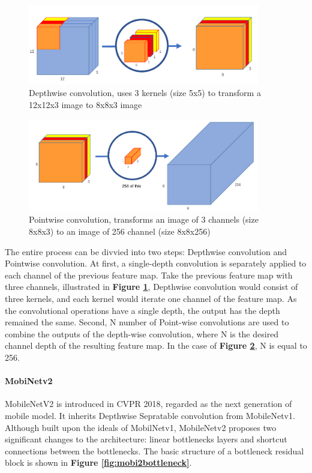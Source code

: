  \begin{figure}[H]
     \centering
     \includegraphics[width=0.9\textwidth]{chapter2/image/mobi1.png}
     \caption{Depthwise convolution, uses 3 kernels (size 5x5) to transform a 12x12x3 image to 8x8x3 image}
     \label{fig:mobi1}
 \end{figure}
 
 \begin{figure}[H]
     \centering
     \includegraphics[width=0.9\textwidth]{chapter2/image/mobi2.png}
     \caption{Pointwise convolution, transforms an image of 3 channels (size 8x8x3) to an image of 256 channel (size 8x8x256)}
     \label{fig:mobi2}
 \end{figure}
 
 The entire process can be divvied into two steps: Depthwise convolution and Pointwise convolution. At first, a single-depth convolution is separately applied to each channel of the previous feature map. Take the previous feature map with three channels, illustrated in \textbf{Figure \ref{fig:mobi1}}, Depthwise convolution would consist of three kernels, and each kernel would iterate one channel of the feature map. As the convolutional operations have a single depth, the output has the depth remained the same. Second, N number of Point-wise convolutions are used to combine the outputs of the depth-wise convolution, where N is the desired channel depth of the resulting feature map. In the case of \textbf{Figure \ref{fig:mobi2}}, N is equal to 256. 
 
 \paragraph{MobiNetv2}
 MobileNetV2 is introduced in CVPR 2018, regarded as the next generation of mobile model. It inherits Depthwise Sepratable convolution from MobileNetv1. Although built upon the ideals of MobilNetv1, MobileNetv2 proposes two significant changes to the architecture: linear bottlenecks layers and shortcut connections between the bottlenecks. The basic structure of a bottleneck residual block is shown in \textbf{Figure \ref{fig:mobi2bottleneck}}. \par
 
